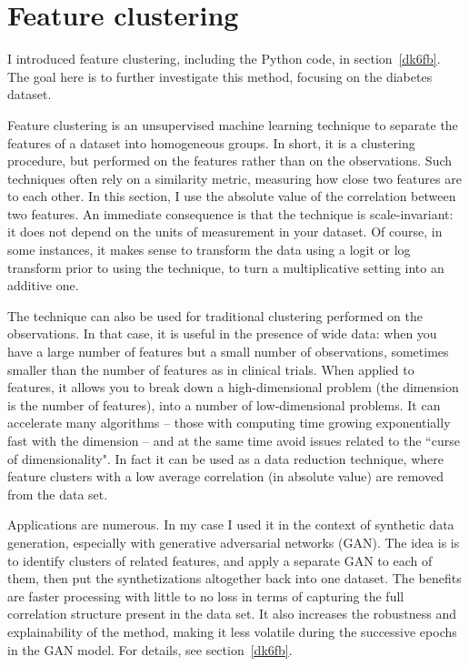 \documentclass[oneside,10pt]{book}
\begin{document}
\section{Feature clustering}\label{fcvgfd}

I introduced \textcolor{index}{feature clustering}, including the Python code, in section~\ref{dk6fb}. The goal here is
 to further investigate this method, focusing on the diabetes dataset.

Feature clustering is an unsupervised machine learning technique to separate the features of a dataset into homogeneous groups.
In short, it is a clustering procedure, but performed on the features rather than on the observations. Such techniques often
 rely on a similarity metric, measuring how close two features are to each other. In this section, I use the 
 absolute value of the correlation between two features. An immediate consequence is that the technique is scale-invariant: it does not
 depend on the units of measurement in your dataset. Of course, in some instances, it makes sense to transform the data using a logit or
 log transform prior to using the technique, to turn a multiplicative setting into an additive one.

The technique can also be used for traditional clustering performed on the observations. In that case, it is useful in the presence of 
wide data: when you have a large number of features but a small number of observations, sometimes smaller than the number of features
 as in clinical trials. When applied to features, it allows you to break down a high-dimensional problem (the dimension is the number of features), into a number of low-dimensional problems. It can accelerate many algorithms -- those with computing time growing exponentially  fast with the dimension -- and at the same time avoid issues related to the ``curse of dimensionality". In fact it can be used as a data reduction technique, where feature clusters with a low average correlation (in absolute value) are removed from the data set.





Applications are numerous. In my case I used it in the context of synthetic data generation, especially
 with generative adversarial networks (GAN). The idea is is to identify clusters of related features, and apply a separate GAN to each of them, 
 then put the synthetizations altogether back into one dataset. The benefits are faster processing with little to no loss in terms of capturing 
 the full correlation structure present in the data set. It also increases the robustness and explainability of the method, making it less volatile 
 during the successive epochs in the GAN model.
 For details, see section~\ref{dk6fb}.
\end{document}
